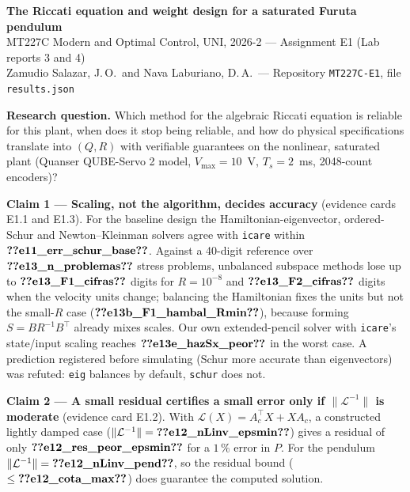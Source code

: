 \documentclass[10pt,a4paper]{article}
\begin{document}
\begin{center}
{\large\bfseries The Riccati equation and weight design for a saturated Furuta pendulum}\\[2pt]
{\small MT227C Modern and Optimal Control, UNI, 2026-2 --- Assignment E1 (Lab reports 3 and 4)}\\[1pt]
{\small Zamudio Salazar, J.\,O.\ and Nava Laburiano, D.\,A.\ --- Repository \texttt{MT227C-E1}, file \texttt{results.json}}
\end{center}

\textbf{Research question.} Which method for the algebraic Riccati equation is reliable for this plant,
when does it stop being reliable, and how do physical specifications translate into $(Q,R)$ with verifiable
guarantees on the nonlinear, saturated plant (Quanser QUBE-Servo 2 model, $V_{\max}=10$~V, $T_s=2$~ms,
2048-count encoders)?

\textbf{Claim 1 --- Scaling, not the algorithm, decides accuracy} (evidence cards E1.1 and E1.3).
For the baseline design the Hamiltonian-eigenvector, ordered-Schur and Newton--Kleinman solvers agree with
\texttt{icare} within $\V{e11_err_schur_base}$. Against a 40-digit reference over $\V{e13_n_problemas}$ stress problems,
unbalanced subspace methods lose up to $\V{e13_F1_cifras}$ digits for $R=10^{-8}$ and $\V{e13_F2_cifras}$ digits when the
velocity units change; balancing the Hamiltonian fixes the units but not the small-$R$ case
($\V{e13b_F1_hambal_Rmin}$), because forming $S=BR^{-1}B^\top$ already mixes scales. Our own extended-pencil solver with
\texttt{icare}'s state/input scaling reaches $\V{e13e_hazSx_peor}$ in the worst case. A prediction registered before
simulating (Schur more accurate than eigenvectors) was refuted: \texttt{eig} balances by default, \texttt{schur} does not.

\textbf{Claim 2 --- A small residual certifies a small error only if $\|\mathcal L^{-1}\|$ is moderate}
(evidence card E1.2). With $\mathcal L(X)=A_c^\top X+XA_c$, a constructed lightly damped case
($\|\mathcal L^{-1}\|=\V{e12_nLinv_epsmin}$) gives a residual of only $\V{e12_res_peor_epsmin}$ for a $1\,\%$ error in $P$. For the
pendulum $\|\mathcal L^{-1}\|=\V{e12_nLinv_pend}$, so the residual bound ($\le\V{e12_cota_max}$) does guarantee the computed
solution.
\end{document}
